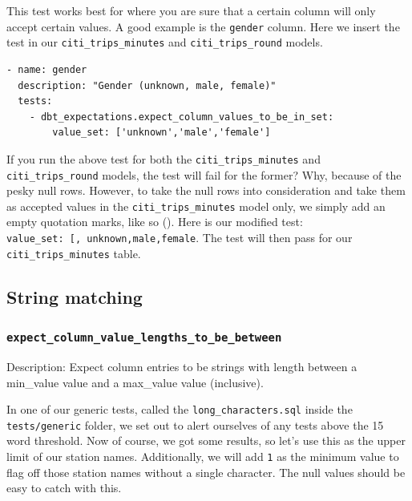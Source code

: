 \documentclass[
]{book}
\begin{document}
This test works best for where you are sure that a certain column will only accept certain values. A good example is the \texttt{gender} column. Here we insert the test in our \texttt{citi\_trips\_minutes} and \texttt{citi\_trips\_round} models.

\begin{verbatim}
- name: gender
  description: "Gender (unknown, male, female)"
  tests:
    - dbt_expectations.expect_column_values_to_be_in_set:
        value_set: ['unknown','male','female']
\end{verbatim}

If you run the above test for both the \texttt{citi\_trips\_minutes} and \texttt{citi\_trips\_round} models, the test will fail for the former? Why, because of the pesky null rows. However, to take the null rows into consideration and take them as accepted values in the \texttt{citi\_trips\_minutes} model only, we simply add an empty quotation marks, like so (\texttt{\textquotesingle{}\textquotesingle{}}). Here is our modified test: \texttt{value\_set:\ {[}\textquotesingle{}\textquotesingle{},\ \textquotesingle{}unknown\textquotesingle{},\textquotesingle{}male\textquotesingle{},\textquotesingle{}female\textquotesingle{}{]}}. The test will then pass for our \texttt{citi\_trips\_minutes} table.

\hypertarget{string-matching}{%
\subsection{String matching}\label{string-matching}}

\hypertarget{expect_column_value_lengths_to_be_between}{%
\subsubsection{\texorpdfstring{\texttt{expect\_column\_value\_lengths\_to\_be\_between}}{expect\_column\_value\_lengths\_to\_be\_between}}\label{expect_column_value_lengths_to_be_between}}

Description: Expect column entries to be strings with length between a min\_value value and a max\_value value (inclusive).

In one of our generic tests, called the \texttt{long\_characters.sql} inside the \texttt{tests/generic} folder, we set out to alert ourselves of any tests above the 15 word threshold. Now of course, we got some results, so let's use this as the upper limit of our station names. Additionally, we will add \texttt{1} as the minimum value to flag off those station names without a single character. The null values should be easy to catch with this.
\end{document}
